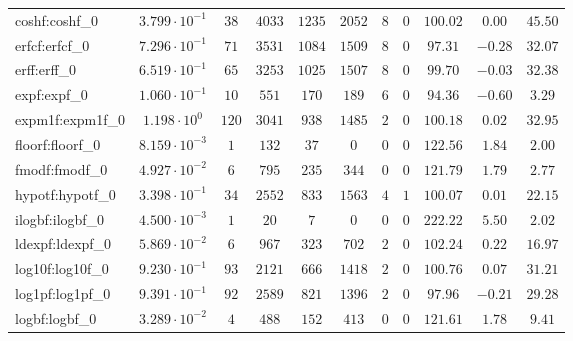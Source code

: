 \begin{tabular}{|l|c|c|c|c|c|c|c|c|c|c|}
coshf:coshf\_0               & $ 3.799 \cdot 10^{-1} $ & $ 38     $ & $ 4033  $ & $ 1235  $ & $ 2052  $ & $ 8   $ & $ 0 $ & $ 100.02      $ & $ 0.00    $ & $ 45.50   $ \\
erfcf:erfcf\_0               & $ 7.296 \cdot 10^{-1} $ & $ 71     $ & $ 3531  $ & $ 1084  $ & $ 1509  $ & $ 8   $ & $ 0 $ & $ 97.31       $ & $ -0.28   $ & $ 32.07   $ \\
erff:erff\_0                 & $ 6.519 \cdot 10^{-1} $ & $ 65     $ & $ 3253  $ & $ 1025  $ & $ 1507  $ & $ 8   $ & $ 0 $ & $ 99.70       $ & $ -0.03   $ & $ 32.38   $ \\
expf:expf\_0                 & $ 1.060 \cdot 10^{-1} $ & $ 10     $ & $ 551   $ & $ 170   $ & $ 189   $ & $ 6   $ & $ 0 $ & $ 94.36       $ & $ -0.60   $ & $ 3.29    $ \\
expm1f:expm1f\_0             & $ 1.198 \cdot 10^{0}  $ & $ 120    $ & $ 3041  $ & $ 938   $ & $ 1485  $ & $ 2   $ & $ 0 $ & $ 100.18      $ & $ 0.02    $ & $ 32.95   $ \\
floorf:floorf\_0             & $ 8.159 \cdot 10^{-3} $ & $ 1      $ & $ 132   $ & $ 37    $ & $ 0     $ & $ 0   $ & $ 0 $ & $ 122.56      $ & $ 1.84    $ & $ 2.00    $ \\
fmodf:fmodf\_0               & $ 4.927 \cdot 10^{-2} $ & $ 6      $ & $ 795   $ & $ 235   $ & $ 344   $ & $ 0   $ & $ 0 $ & $ 121.79      $ & $ 1.79    $ & $ 2.77    $ \\
hypotf:hypotf\_0             & $ 3.398 \cdot 10^{-1} $ & $ 34     $ & $ 2552  $ & $ 833   $ & $ 1563  $ & $ 4   $ & $ 1 $ & $ 100.07      $ & $ 0.01    $ & $ 22.15   $ \\
ilogbf:ilogbf\_0             & $ 4.500 \cdot 10^{-3} $ & $ 1      $ & $ 20    $ & $ 7     $ & $ 0     $ & $ 0   $ & $ 0 $ & $ 222.22      $ & $ 5.50    $ & $ 2.02    $ \\
ldexpf:ldexpf\_0             & $ 5.869 \cdot 10^{-2} $ & $ 6      $ & $ 967   $ & $ 323   $ & $ 702   $ & $ 2   $ & $ 0 $ & $ 102.24      $ & $ 0.22    $ & $ 16.97   $ \\
log10f:log10f\_0             & $ 9.230 \cdot 10^{-1} $ & $ 93     $ & $ 2121  $ & $ 666   $ & $ 1418  $ & $ 2   $ & $ 0 $ & $ 100.76      $ & $ 0.07    $ & $ 31.21   $ \\
log1pf:log1pf\_0             & $ 9.391 \cdot 10^{-1} $ & $ 92     $ & $ 2589  $ & $ 821   $ & $ 1396  $ & $ 2   $ & $ 0 $ & $ 97.96       $ & $ -0.21   $ & $ 29.28   $ \\
logbf:logbf\_0               & $ 3.289 \cdot 10^{-2} $ & $ 4      $ & $ 488   $ & $ 152   $ & $ 413   $ & $ 0   $ & $ 0 $ & $ 121.61      $ & $ 1.78    $ & $ 9.41    $ \\

\end{tabular}
